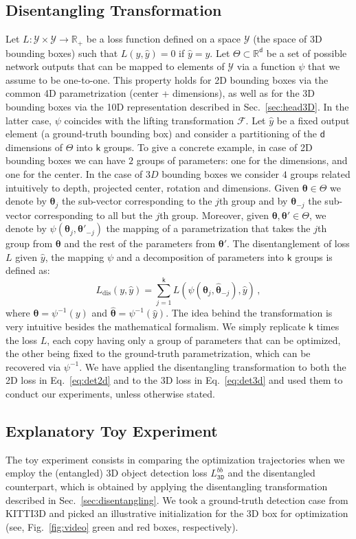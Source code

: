 \documentclass[10pt,twocolumn,letterpaper]{article}
\newcommand{\vct}[1]{\ensuremath{\boldsymbol{#1}}}
\newcommand{\set}[1]{\ensuremath{\mathcal{#1}}}
\newcommand{\con}[1]{\ensuremath{\mathsf{#1}}}
\begin{document}
\subsection{Disentangling Transformation}
Let $L:\set Y\times\set Y\to\mathbb R_+$ be a loss function defined on a space $\set Y$ (\eg the space of 3D bounding boxes) such that $L(y,\hat y)=0$ if $\hat y=y$.
Let $\Theta\subset\mathbb R^\con d$ be a set of possible network outputs that can be mapped to elements of $\set Y$ via a function $\psi$ that we assume to be one-to-one. 
This property holds for 2D bounding boxes via the common 4D parametrization (center + dimensions), as well as for the 3D bounding boxes via the 10D representation described in Sec.~\ref{sec:head3D}.
In the latter case, $\psi$ coincides with the lifting transformation $\set F$. 
Let $\hat y$ be a fixed output element (\eg a ground-truth bounding box) and consider a partitioning of the $\con d$ dimensions of $\Theta$ into $\con k$ groups. 
To give a concrete example, in case of 2D bounding boxes we can have $2$ groups of parameters: one for the dimensions, and one for the center. In the case of $3D$ bounding boxes we consider $4$ groups related intuitively to depth, projected center, rotation and dimensions. Given $\vct\theta\in\Theta$ we denote by $\vct\theta_j$ the sub-vector corresponding to the $j$th group and by $\vct\theta_{-j}$ the sub-vector corresponding to all but the $j$th group. Moreover, given $\vct \theta,\vct \theta'\in\Theta$, we denote by $\psi(\vct \theta_j,\vct \theta'_{-j})$ the mapping of a parametrization that takes the $j$th group from $\vct \theta$ and the rest of the parameters from $\vct \theta'$.
The disentanglement of loss $L$ given $\hat y$, the mapping $\psi$ and a decomposition of parameters into $\con k$ groups is defined as:
\[
L_\text{dis}(y,\hat y)=\sum_{j=1}^\con k L(\psi(\vct \theta_j,\vct{\hat\theta}_{-j}),\hat y)\,,
\]
where $\vct\theta=\psi^{-1}(y)$ and $\vct{\hat \theta}=\psi^{-1}(\hat y)$.
The idea behind the transformation is very intuitive besides the mathematical formalism. We simply replicate $\con k$ times the loss $L$, each copy having only a group of parameters that can be optimized, the other being fixed to the ground-truth parametrization, which can be recovered via $\psi^{-1}$.
We have applied the disentangling transformation to both the 2D loss in Eq.~\eqref{eq:det2d} and to the 3D loss in Eq.~\eqref{eq:det3d} and used them to conduct our experiments, unless otherwise stated. 


\subsection{Explanatory Toy Experiment}\label{sec:toy}
The toy experiment consists in comparing the optimization trajectories when we employ the (entangled) 3D object detection loss $L_\mathtt{3D}^{bb}$ and the disentangled counterpart, which is obtained by applying the disentangling transformation described in Sec.~\ref{sec:disentangling}. We took a ground-truth detection case from KITTI3D and picked an illustrative initialization for the 3D box for optimization (see, Fig.~\ref{fig:video} green and red boxes, respectively).
\end{document}
